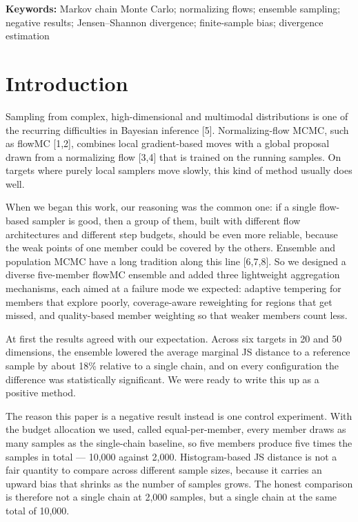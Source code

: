 \documentclass[11pt]{article}
\begin{document}
\noindent\textbf{Keywords:} Markov chain Monte Carlo; normalizing flows;
ensemble sampling; negative results; Jensen--Shannon divergence;
finite-sample bias; divergence estimation

\section{Introduction}

Sampling from complex, high-dimensional and multimodal distributions is one
of the recurring difficulties in Bayesian inference [5]. Normalizing-flow
MCMC, such as flowMC [1,2], combines local gradient-based moves with a global
proposal drawn from a normalizing flow [3,4] that is trained on the running
samples. On targets where purely local samplers move slowly, this kind of
method usually does well.

When we began this work, our reasoning was the common one: if a single
flow-based sampler is good, then a group of them, built with different flow
architectures and different step budgets, should be even more reliable,
because the weak points of one member could be covered by the others.
Ensemble and population MCMC have a long tradition along this line [6,7,8]. So
we designed a diverse five-member flowMC ensemble and added three lightweight
aggregation mechanisms, each aimed at a failure mode we expected: adaptive
tempering for members that explore poorly, coverage-aware reweighting for
regions that get missed, and quality-based member weighting so that weaker
members count less.

At first the results agreed with our expectation. Across six targets in 20
and 50 dimensions, the ensemble lowered the average marginal JS distance to a
reference sample by about 18\% relative to a single chain, and on every
configuration the difference was statistically significant. We were ready to
write this up as a positive method.

The reason this paper is a negative result instead is one control experiment.
With the budget allocation we used, called equal-per-member, every member
draws as many samples as the single-chain baseline, so five members produce
five times the samples in total --- 10{,}000 against 2{,}000. Histogram-based
JS distance is not a fair quantity to compare across different sample sizes,
because it carries an upward bias that shrinks as the number of samples grows.
The honest comparison is therefore not a single chain at 2{,}000 samples, but
a single chain at the same total of 10{,}000.
\end{document}
